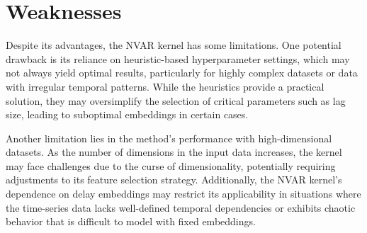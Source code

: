 \section{Weaknesses}

Despite its advantages, the NVAR kernel has some limitations. One potential drawback is its reliance on heuristic-based hyperparameter settings, which may not always yield optimal results, particularly for highly complex datasets or data with irregular temporal patterns. While the heuristics provide a practical solution, they may oversimplify the selection of critical parameters such as lag size, leading to suboptimal embeddings in certain cases.

Another limitation lies in the method's performance with high-dimensional datasets. As the number of dimensions in the input data increases, the kernel may face challenges due to the curse of dimensionality, potentially requiring adjustments to its feature selection strategy. Additionally, the NVAR kernel's dependence on delay embeddings may restrict its applicability in situations where the time-series data lacks well-defined temporal dependencies or exhibits chaotic behavior that is difficult to model with fixed embeddings.
